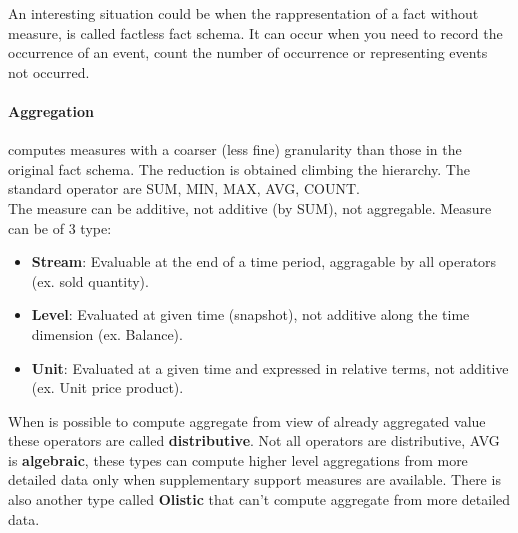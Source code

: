 \documentclass[12pt]{article}
\begin{document}
An interesting situation could be when the rappresentation of a fact without measure, is called factless fact schema. It can occur when you need to record the occurrence of an event, count the number of occurrence or representing events not occurred.

\paragraph{Aggregation} computes measures with a coarser (less fine) granularity than those in the original fact schema. The reduction is obtained climbing the hierarchy. The standard operator are SUM, MIN, MAX, AVG, COUNT.\\
The measure can be additive, not additive (by SUM), not aggregable. Measure can be of 3 type:
\begin{itemize}
  \item \textbf{Stream}: Evaluable at the end of a time period, aggragable by all operators (ex. sold quantity).
  \item \textbf{Level}: Evaluated at given time (snapshot), not additive along the time dimension (ex. Balance).
  \item \textbf{Unit}: Evaluated at a given time and expressed in relative terms, not additive (ex. Unit price product).
\end{itemize}
When is possible to compute aggregate from view of already aggregated value these operators are called \textbf{distributive}. Not all operators are distributive, AVG is \textbf{algebraic}, these types can compute higher level aggregations from more detailed data only when supplementary support measures are available. There is also another type called \textbf{Olistic} that can't compute aggregate from more detailed data.






\end{document}
